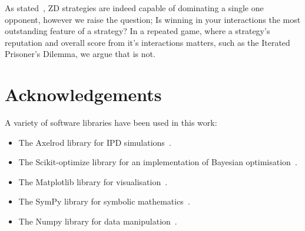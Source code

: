 \documentclass[10pt]{article}
\begin{document}
As stated~\cite{Press2012}, ZD strategies are indeed capable of dominating a
single one opponent, however we raise the question; Is winning in your
interactions the most outstanding feature of a strategy? In a repeated game,
where a strategy's reputation and overall score from it's interactions matters,
such as the Iterated Prisoner's Dilemma, we argue that is not.

\section{Acknowledgements}

A variety of software libraries have been used in this work:

\begin{itemize}
    \item The Axelrod library for IPD simulations~\cite{axelrodproject}.
    \item The Scikit-optimize library for an implementation of Bayesian optimisation~\cite{tim_head_2018_1207017}.
    \item The Matplotlib library for visualisation~\cite{hunter2007matplotlib}.
    \item The SymPy library for symbolic mathematics~\cite{sympy}.
    \item The Numpy library for data manipulation~\cite{walt2011numpy}.
\end{itemize}






\appendix

\end{document}
